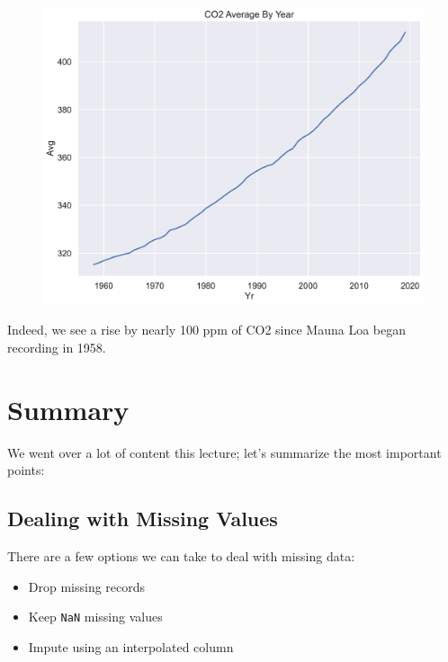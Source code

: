 \documentclass[
  letterpaper,
  DIV=11,
  numbers=noendperiod]{scrreprt}
\providecommand{\tightlist}{%
  \setlength{\itemsep}{0pt}\setlength{\parskip}{0pt}}\usepackage{longtable,booktabs,array}
\begin{document}
\begin{figure}[H]

{\centering \includegraphics{eda/eda_files/figure-pdf/cell-77-output-1.pdf}

}

\end{figure}

Indeed, we see a rise by nearly 100 ppm of CO2 since Mauna Loa began
recording in 1958.


\hypertarget{summary}{%
\chapter{Summary}\label{summary}}

We went over a lot of content this lecture; let's summarize the most
important points:

\hypertarget{dealing-with-missing-values}{%
\section{Dealing with Missing
Values}\label{dealing-with-missing-values}}

There are a few options we can take to deal with missing data:

\begin{itemize}
\tightlist
\item
  Drop missing records
\item
  Keep \texttt{NaN} missing values
\item
  Impute using an interpolated column
\end{itemize}
\end{document}
